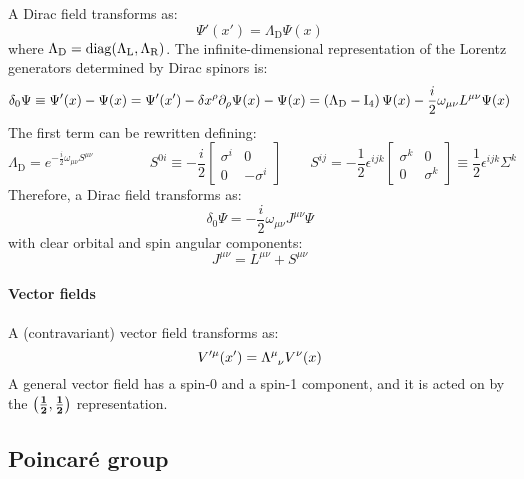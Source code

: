 A Dirac field transforms as:
\begin{equation}
  \Psi'(x') = \Lambda_\text{D} \Psi(x)
  \label{eq:1.49}
\end{equation}
where $ \Lambda_\text{D} = \operatorname{diag}(\Lambda_\text{L} , \Lambda_\text{R}) $. The infinite-dimensional representation of the Lorentz generators determined by Dirac spinors is:
\begin{equation*}
  \delta_0 \Psi \equiv \Psi'(x) - \Psi(x) = \Psi'(x') - \delta x^\rho \partial_\rho \Psi(x) - \Psi(x) = \left( \Lambda_\text{D} - \mathrm{I}_4 \right) \Psi(x) - \frac{i}{2} \omega_{\mu \nu} L^{\mu \nu} \Psi(x)
\end{equation*}
The first term can be rewritten defining:
\begin{equation*}
  \Lambda_\text{D} = e^{-\frac{i}{2} \omega_{\mu \nu} S^{\mu \nu}}
  \qquad \qquad
  S^{0i} \equiv - \frac{i}{2}
  \begin{bmatrix}
    \sigma^i & 0 \\ 0 & -\sigma^i
  \end{bmatrix}
  \qquad
  S^{ij} = - \frac{1}{2} \epsilon^{ijk}
  \begin{bmatrix}
    \sigma^k & 0 \\ 0 & \sigma^k
  \end{bmatrix}
  \equiv \frac{1}{2} \epsilon^{ijk} \Sigma^k
\end{equation*}
Therefore, a Dirac field transforms as:
\begin{equation}
  \delta_0 \Psi = - \frac{i}{2} \omega_{\mu \nu} J^{\mu \nu} \Psi
  \label{eq:1.50}
\end{equation}
with clear orbital and spin angular components:
\begin{equation}
  J^{\mu \nu} = L^{\mu \nu} + S^{\mu \nu}
  \label{eq:1.51}
\end{equation}

\paragraph{Vector fields}

A (contravariant) vector field transforms as:
\begin{equation}
  V'^\mu(x') = \tensor{\Lambda}{^\mu_\nu} V^\nu(x)
  \label{eq:1.52}
\end{equation}
A general vector field has a spin-0 and a spin-1 component, and it is acted on by the $ \mathbf{\left( \frac{1}{2},\frac{1}{2} \right)} $ representation.

\subsection{Poincaré group}

